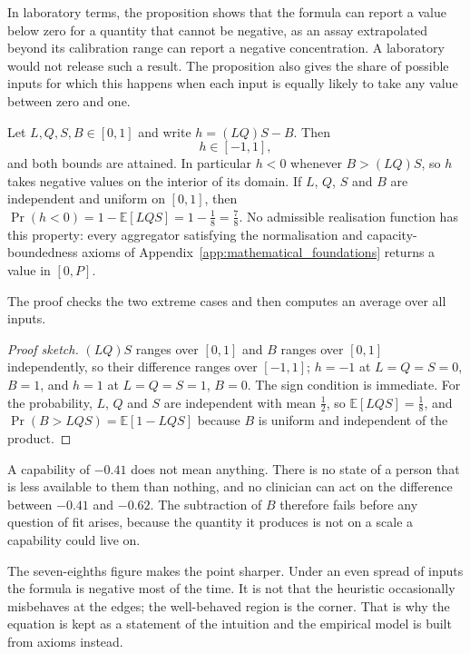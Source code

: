 In laboratory terms, the proposition shows that the formula can report a value below zero for a quantity that cannot be negative, as an assay extrapolated beyond its calibration range can report a negative concentration. A laboratory would not release such a result. The proposition also gives the share of possible inputs for which this happens when each input is equally likely to take any value between zero and one.

\begin{proposition}
\label{prop:lit-heuristic}
Let $L,Q,S,B\in[0,1]$ and write $h=(LQ)S-B$. Then
\[
  h\in[-1,1],
\]
and both bounds are attained. In particular $h<0$ whenever $B>(LQ)S$, so $h$
takes negative values on the interior of its domain. If $L$, $Q$, $S$ and $B$
are independent and uniform on $[0,1]$, then
$\Pr(h<0)=1-\mathbb E[LQS]=1-\tfrac18=\tfrac78$. No admissible realisation
function has this property: every aggregator satisfying the normalisation and
capacity-boundedness axioms of Appendix~\ref{app:mathematical_foundations}
returns a value in $[0,P]$.
\end{proposition}

The proof checks the two extreme cases and then computes an average over all inputs.

\begin{proof}[Proof sketch]
$(LQ)S$ ranges over $[0,1]$ and $B$ ranges over $[0,1]$ independently, so their
difference ranges over $[-1,1]$; $h=-1$ at $L=Q=S=0$, $B=1$, and $h=1$ at
$L=Q=S=1$, $B=0$. The sign condition is immediate. For the probability, $L$,
$Q$ and $S$ are independent with mean $\tfrac12$, so $\mathbb E[LQS]=\tfrac18$,
and $\Pr(B>LQS)=\mathbb E[1-LQS]$ because $B$ is uniform and independent of the
product.
\end{proof}

\begin{reading}
A capability of $-0.41$ does not mean anything. There is no state of a person
that is less available to them than nothing, and no clinician can act on the
difference between $-0.41$ and $-0.62$. The subtraction of $B$ therefore fails
before any question of fit arises, because the quantity it produces is not on a
scale a capability could live on.

The seven-eighths figure makes the point sharper. Under an even spread of
inputs the formula is negative most of the time. It is not that the heuristic
occasionally misbehaves at the edges; the well-behaved region is the corner.
That is why the equation is kept as a statement of the intuition and the
empirical model is built from axioms instead.
\end{reading}

